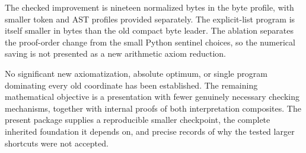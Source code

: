 The checked improvement is nineteen normalized bytes in the byte profile,
with smaller token and AST profiles provided separately. The explicit-list
program is itself smaller in bytes than the old compact byte leader.
The ablation separates the proof-order change from the small Python
sentinel choices, so the numerical saving is not presented as a new
arithmetic axiom reduction.

No significant new axiomatization, absolute optimum, or single program
dominating every old coordinate has been established. The remaining
mathematical objective is a presentation with fewer genuinely necessary
checking mechanisms, together with internal proofs of both interpretation
composites. The present package supplies a reproducible smaller checkpoint,
the complete inherited foundation it depends on, and precise records of
why the tested larger shortcuts were not accepted.
